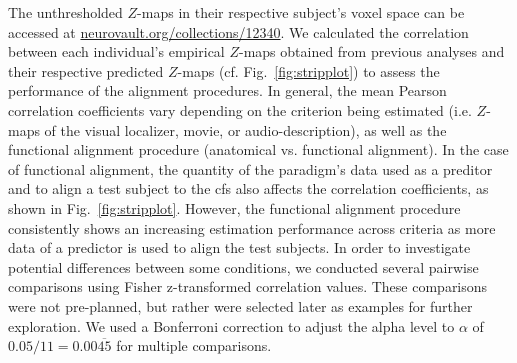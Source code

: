 %








The unthresholded $Z$-maps in their respective subject's voxel space can be
accessed at
\href{https://identifiers.org/neurovault.collection:12340}{\url{neurovault.org/collections/12340}}.
%
We calculated the correlation between each individual's empirical $Z$-maps
obtained from previous analyses \citep{haeusler2022processing,
sengupta2016extension} and their respective predicted $Z$-maps (cf.
Fig.~\ref{fig:stripplot}) to assess the performance of the alignment procedures.
%
In general, the mean Pearson correlation coefficients vary depending on the
criterion being estimated (i.e. $Z$-maps of the visual localizer, movie, or
audio-description), as well as the functional alignment procedure (anatomical
vs. functional alignment).
%
In the case of functional alignment, the quantity of the paradigm's data used as
a preditor and to align a test subject to the \ac{cfs} also affects the
correlation coefficients, as shown in Fig.~\ref{fig:stripplot}.
%
However, the functional alignment procedure consistently shows an increasing
estimation performance across criteria as more data of a predictor is used to
align the test subjects.
%
In order to investigate potential differences between some conditions, we
conducted several pairwise comparisons using Fisher z-transformed correlation
values.
%
These comparisons were not pre-planned, but rather were selected later as
examples for further exploration.
%
We used a Bonferroni correction to adjust the alpha level to $\alpha$ of $0.05 /
11 = 0.00\overline{45}$ for multiple comparisons.


